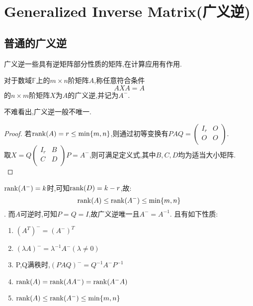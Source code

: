 \documentclass[UTF8,a4paper,notitlepage]{book}
\begin{document}
        \section{Generalized Inverse Matrix(广义逆)}%
        \subsection{普通的广义逆}
        广义逆一些具有逆矩阵部分性质的矩阵,在计算应用有作用.
        \begin{definition}[普通的广义逆]
            对于数域$\mathbb{F}$上的$m\times n$阶矩阵$A$,称任意符合条件$$AXA=A$$的$n\times m$阶矩阵$X$为$A$的广义逆,并记为$A^-$.
        \end{definition}
        不难看出,广义逆一般不唯一.
        \begin{proof}
            若$\operatorname{rank}(A)=r\leq \min\{m,n\}$,则通过初等变换有$PAQ=\begin{pmatrix} I_r&O \\ O&O \\ \end{pmatrix}$.\\ 
            取$X=Q\begin{pmatrix} I_r&B \\ C&D \\ \end{pmatrix}P=A^-$,则可满足定义式,其中$B,C,D$均为适当大小矩阵.\\
            \end{proof}
        $\operatorname{rank}(A^-)=k$时,可知$\operatorname{rank}(D)=k-r$,故:$$\operatorname{rank}(A)\leq\operatorname{rank}(A^-)\leq\min\{m,n\}$$.
        而$A$可逆时,可知$P=Q=I$,故广义逆唯一且$A^-=A^{-1}$.
        且有如下性质:
        \begin{corollary}[广义逆的性质]\mbox{}
            \begin{enumerate}
                \item $(A^T)^-=(A^-)^T$
                \item $(\lambda A)^-=\lambda^{-1}A^-(\lambda\neq 0)$
                \item P,Q满秩时,$(PAQ)^-=Q^{-1}A^-P^{-1}$
                \item $\operatorname{rank}(A)=\operatorname{rank}(AA^-)=\operatorname{rank}(A^-A)$
                \item $\operatorname{rank}(A)\leq\operatorname{rank}(A^-)\leq\min\{m,n\}$
            \end{enumerate}
        \end{corollary}
\end{document}
